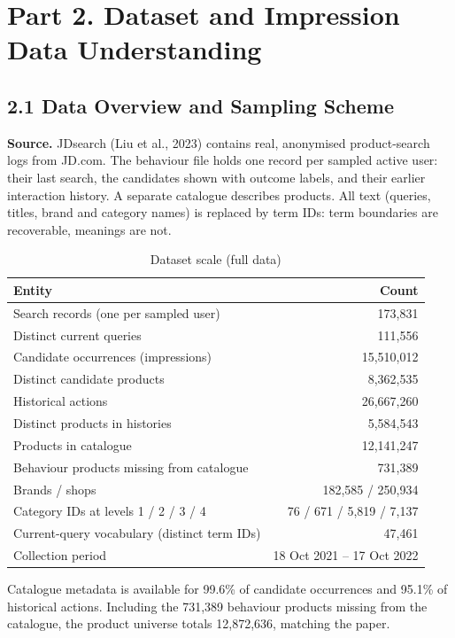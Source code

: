 \documentclass[11pt,a4paper]{article}
\newcommand{\hd}[1]{\textbf{#1}}
\newcommand{\tablestyle}{\small}
\newcommand{\headrow}{}
\begin{document}
\section{Part 2. Dataset and Impression Data Understanding}

\subsection{2.1 Data Overview and Sampling Scheme}

\textbf{Source.} JDsearch (Liu et al., 2023) contains real, anonymised product-search logs from JD.com. The behaviour file holds one record per sampled active user: their last search, the candidates shown with outcome labels, and their earlier interaction history. A separate catalogue describes products. All text (queries, titles, brand and category names) is replaced by term IDs: term boundaries are recoverable, meanings are not.

\begin{table}[H]
\caption{Dataset scale (full data)}
\tablestyle
\centering
\begin{tabularx}{0.85\textwidth}{L R}
\toprule
\headrow \hd{Entity} & \hd{Count} \\
\midrule
Search records (one per sampled user) & 173,831 \\
Distinct current queries & 111,556 \\
Candidate occurrences (impressions) & 15,510,012 \\
Distinct candidate products & 8,362,535 \\
Historical actions & 26,667,260 \\
Distinct products in histories & 5,584,543 \\
Products in catalogue & 12,141,247 \\
Behaviour products missing from catalogue & 731,389 \\
Brands / shops & 182,585 / 250,934 \\
Category IDs at levels 1 / 2 / 3 / 4 & 76 / 671 / 5,819 / 7,137 \\
Current-query vocabulary (distinct term IDs) & 47,461 \\
Collection period & 18 Oct 2021 -- 17 Oct 2022 \\
\bottomrule
\end{tabularx}
\end{table}

Catalogue metadata is available for 99.6\% of candidate occurrences and 95.1\% of historical actions. Including the 731,389 behaviour products missing from the catalogue, the product universe totals 12,872,636, matching the paper.
\end{document}
